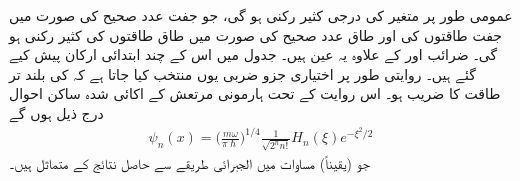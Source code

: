  عمومی طور پر  متغیر  کی    درجی کثیر رکنی ہو گی، جو جفت عدد صحیح  کی صورت میں جفت طاقتوں کی  اور طاق عدد صحیح  کی صورت میں طاق طاقتوں کی کثیر رکنی ہو گی۔ ضرائب     اور   کے علاوہ یہ عین    ہیں۔ جدول  میں اس کے چند ابتدائی ارکان پیش کیے گئے ہیں۔ روایتی طور پر اختیاری جزو ضربی یوں منتخب کیا جاتا ہے کہ  کی بلند تر طاقت کا  ضریب    ہو۔ اس روایت کے تحت ہارمونی مرتعش کے اکائی شدہ  ساکن احوال درج ذیل ہوں گے
\begin{align}\label{مساوات_غیر_تابع_شروڈنگر_ہارمونی_معمول_شدہ_این_ویں}
\psi_{n}(x)=\big (\frac{m\omega}{\pi\hslash}\big )^{1/4}\frac{1}{\sqrt{2^{n}n!}}H_{n}(\xi)e^{-\xi^{2}/2}
\end{align}
جو (یقیناً) مساوات  میں الجبرائی طریقے سے حاصل نتائج کے متماثل ہیں۔

